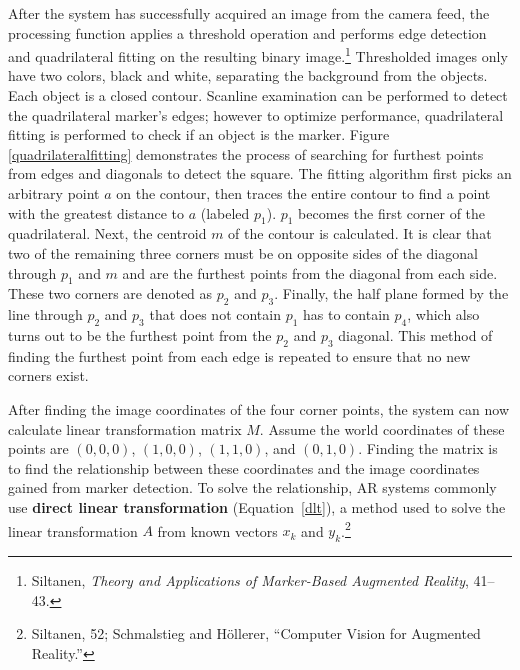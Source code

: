 After the system has successfully acquired an image from the camera feed, the processing function applies a threshold operation and performs edge detection and quadrilateral fitting on the resulting binary image.\footnote{Siltanen, \textit{Theory and Applications of Marker-Based Augmented Reality}, 41–43.} Thresholded images only have two colors, black and white, separating the background from the objects. Each object is a closed contour. Scanline examination can be performed to detect the quadrilateral marker's edges; however to optimize performance, quadrilateral fitting is performed to check if an object is the marker. Figure \ref{quadrilateralfitting} demonstrates the process of searching for furthest points from edges and diagonals to detect the square. The fitting algorithm first picks an arbitrary point $a$ on the contour, then traces the entire contour to find a point with the greatest distance to $a$ (labeled $p_1$). $p_1$ becomes the first corner of the quadrilateral. Next, the centroid $m$ of the contour is calculated. It is clear that two of the remaining three corners must be on opposite sides of the diagonal through $p_1$ and $m$ and are the furthest points from the diagonal from each side. These two corners are denoted as $p_2$ and $p_3$. Finally, the half plane formed by the line through $p_2$ and $p_3$ that does not contain $p_1$ has to contain $p_4$, which also turns out to be the furthest point from the $p_2$ and $p_3$ diagonal. This method of finding the furthest point from each edge is repeated to ensure that no new corners exist.

\begin{figure}[!ht]
\vspace{-.1 in}
\end{figure}

After finding the image coordinates of the four corner points, the system can now calculate linear transformation matrix $M$. Assume the world coordinates of these points are $(0, 0, 0)$, $(1, 0, 0)$, $(1, 1, 0)$, and $(0, 1, 0)$. Finding the matrix is to find the relationship between these coordinates and the image coordinates gained from marker detection. To solve the relationship, AR systems commonly use \textbf{direct linear transformation} (Equation~\ref{dlt}), a method used to solve the linear transformation $A$ from known vectors $x_k$ and $y_k$.\footnote{Siltanen, 52; Schmalstieg and Höllerer, “Computer Vision for Augmented Reality.”}

